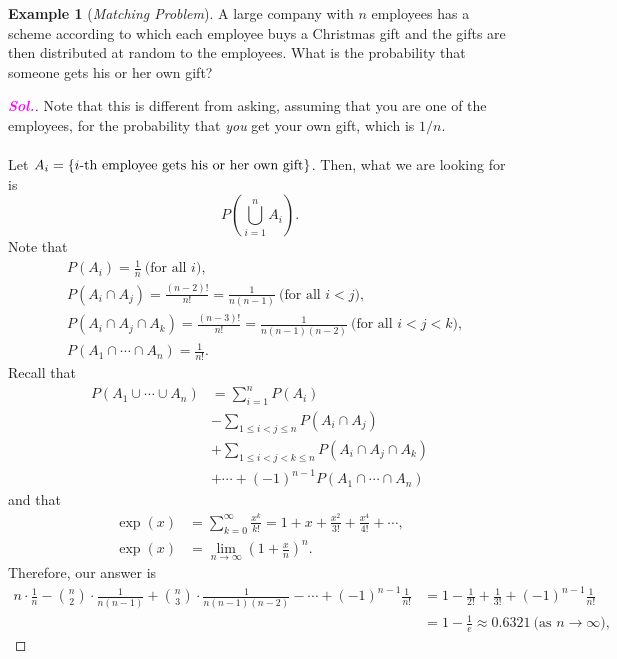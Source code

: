 \documentclass[12pt,a4paper]{article}
\theoremstyle{definition}
\newtheorem{example}{Example}[section]
\theoremstyle{definition}
\theoremstyle{definition}
\theoremstyle{definition}
\theoremstyle{remark}
\theoremstyle{definition}
\newcommand{\sol}{\textcolor{magenta}{\bf \textit{Sol.}}\quad}
\begin{document}
\begin{example}[\textit{Matching Problem}]
	A large company with $n$ employees has a scheme according to which each employee buys a Christmas gift and the gifts are then distributed at random to the employees. What is the probability that someone gets his or her own gift?
	\begin{proof}[\sol]
		Note that this is different from asking, assuming that you are one of the employees, for the probability that \textit{you} get your own gift, which is $1/n$.\\
		\\
		Let $A_i=\set{i\text{-th employee gets his or her own gift}}$. Then, what we are looking for is \[
		P\left(\bigcup_{i=1}^nA_i\right).
		\] Note that \begin{align*}
		&P(A_i)=\frac{1}{n}\ \text{(for all $i$)},\\
		&P(A_i\cap A_j)=\frac{(n-2)!}{n!}=\frac{1}{n(n-1)}\ \text{(for all $i<j$)},\\
		&P(A_i\cap A_j\cap A_k)=\frac{(n-3)!}{n!}=\frac{1}{n(n-1)(n-2)}\ \text{(for all $i<j<k$)},\\
		&P(A_1\cap\cdots\cap A_n)=\frac{1}{n!}.
		\end{align*} Recall that \begin{align*}
		P(A_1\cup\cdots\cup A_n)&=\sum_{i=1}^nP(A_i)\\
		&-\sum_{1\leq i<j\leq n}P(A_i\cap A_j)\\
		&+\sum_{1\leq i<j<k\leq n}P(A_i\cap A_j\cap A_k)\\
		&+\cdots+(-1)^{n-1}P(A_1\cap\cdots\cap A_n)
		\end{align*} and that \begin{align*}
		\exp(x)&=\sum_{k=0}^\infty\frac{x^k}{k!}=1+x+\frac{x^2}{3!}+\frac{x^4}{4!}+\cdots,\\
		\exp(x)&=\lim\limits_{n\to\infty}\left(1+\frac{x}{n}\right)^n.
		\end{align*}Therefore, our answer is \begin{align*}
		n\cdot\frac{1}{n}-\binom{n}{2}\cdot\frac{1}{n(n-1)}+\binom{n}{3}\cdot\frac{1}{n(n-1)(n-2)}-\cdots+(-1)^{n-1}\frac{1}{n!}&=1-\frac{1}{2!}+\frac{1}{3!}+(-1)^{n-1}\frac{1}{n!}\\
		&=1-\frac{1}{e}\approx 0.6321\ \text{(as $n\to\infty$)},
		\end{align*}
	\end{proof}
\end{example}
\
\end{document}
